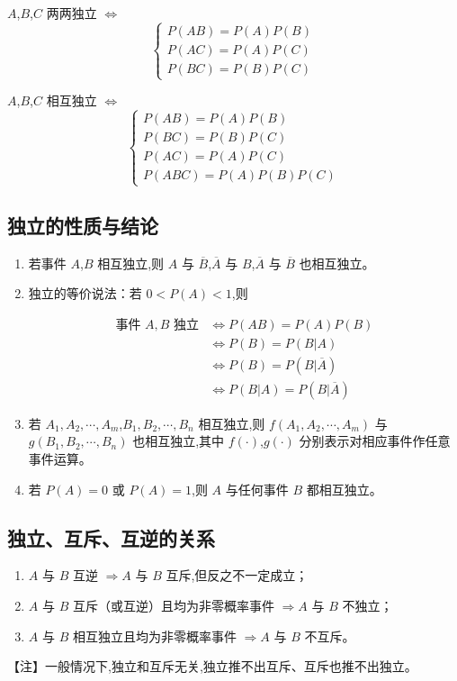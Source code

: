 \documentclass[UTF8]{ctexart}
\theoremstyle{remark}
\begin{document}
 	\(A\),\(B\),\(C\) 两两独立 \(\Leftrightarrow\) 
	\[
	\begin{cases}
		P(AB) = P(A)P(B)\\
		P(AC) = P(A)P(C)\\
		P(BC) = P(B)P(C)
	\end{cases}
	\]
	
	\(A\),\(B\),\(C\) 相互独立 \(\Leftrightarrow\) 
	\[
	\begin{cases}
		P(AB) = P(A)P(B)\\
		P(BC) = P(B)P(C)\\
		P(AC) = P(A)P(C)\\
		P(ABC) = P(A)P(B)P(C)
	\end{cases}
	\]
	
	\subsection{独立的性质与结论}
	\begin{enumerate}
		\item 若事件 \(A\),\(B\) 相互独立,则 \(A\) 与 \(\overline{B}\),\(\overline{A}\) 与 \(B\),\(\overline{A}\) 与 \(\overline{B}\) 也相互独立。
		\item 独立的等价说法：若 \(0 < P(A) < 1\),则
		
		\begin{align*}
			\text{事件 }A,B\text{ 独立} &\Leftrightarrow P(AB) = P(A)P(B)\\
			&\Leftrightarrow P(B) = P(B|A)\\
			&\Leftrightarrow P(B) = P(B|\overline{A})\\
			&\Leftrightarrow P(B|A) = P(B|\overline{A})
		\end{align*}
		
		\item 若 \(A_1, A_2, \cdots, A_m\),\(B_1, B_2, \cdots, B_n\) 相互独立,则 \(f(A_1, A_2, \cdots, A_m)\) 与 \(g(B_1, B_2, \cdots, B_n)\) 也相互独立,其中 \(f(\cdot)\),\(g(\cdot)\) 分别表示对相应事件作任意事件运算。
		\item 若 \(P(A) = 0\) 或 \(P(A) = 1\),则 \(A\) 与任何事件 \(B\) 都相互独立。
	\end{enumerate}
	
	\subsection{独立、互斥、互逆的关系}
	\begin{enumerate}
		\item \(A\) 与 \(B\) 互逆 \(\Rightarrow A\) 与 \(B\) 互斥,但反之不一定成立；
		\item \(A\) 与 \(B\) 互斥（或互逆）且均为非零概率事件 \(\Rightarrow A\) 与 \(B\) 不独立；
		\item \(A\) 与 \(B\) 相互独立且均为非零概率事件 \(\Rightarrow A\) 与 \(B\) 不互斥。
		\end{enumerate}
		【注】一般情况下,独立和互斥无关,独立推不出互斥、互斥也推不出独立。
		
\end{document}
